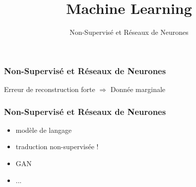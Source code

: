\documentclass{formation}
\title{Machine Learning}
\subtitle{Non-Supervisé et Réseaux de Neurones}
\begin{document}
\maketitle

\begin{frame}
  \frametitle{Non-Supervisé et Réseaux de Neurones}
  Erreur de reconstruction forte $\Rightarrow$ Donnée marginale
\end{frame}

\begin{frame}
  \frametitle{Non-Supervisé et Réseaux de Neurones}
  \begin{itemize}
  \item modèle de langage
  \item traduction non-supervisée !
  \item GAN
  \item ...
  \end{itemize}
\end{frame}
\end{document}
